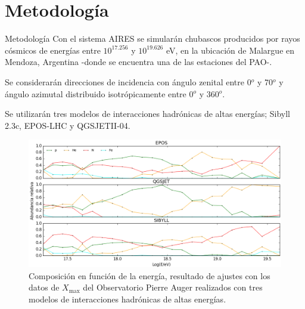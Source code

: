 \documentclass[10pt]{beamer}
\begin{document}
\section{Metodología}
\begin{frame}{Metodología}
Con el sistema AIRES se simularán chubascos producidos por rayos cósmicos de energías entre $10^{17.256}$ y $10^{19.626}$ eV, en la ubicación de Malargue en Mendoza, Argentina -donde se encuentra una de las estaciones del PAO-. \\ \vspace{0.5 cm}

Se considerarán direcciones de incidencia con ángulo zenital entre 0$^{o}$ y 70$^{o}$ y ángulo azimutal distribuido isotrópicamente entre 0$^{o}$ y 360$^{o}$. \\ \vspace{0.5 cm}

Se utilizarán tres modelos de interacciones hadrónicas de altas energías; Sibyll 2.3c, EPOS-LHC y QGSJETII-04.
\end{frame}

\begin{frame}
\begin{figure}[h]
\centering
\includegraphics[height=0.6\textheight]{Figuras/composition} 
\caption{Composición en función de la energía, resultado de ajustes con los datos de $X_{\text{max}}$ del Observatorio Pierre Auger realizados con tres modelos de interacciones hadrónicas de altas energías.}
\label{fig:composition}
\end{figure}	
\end{frame}
\end{document}
